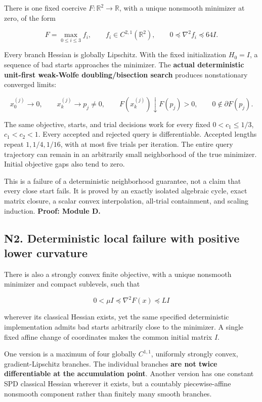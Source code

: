 There is one fixed coercive \(F:\mathbb R^2\to\mathbb R\), with a unique nonsmooth minimizer at zero, of the form

\[
 F=\max_{0\le i\le3}f_i,\qquad f_i\in C^{2,1}(\mathbb R^2),\qquad
 0\preceq\nabla^2f_i\preceq64I.
\]

Every branch Hessian is globally Lipschitz. With the fixed initialization \(H_0=I\), a sequence of bad starts approaches the minimizer. The \textbf{actual deterministic unit-first weak-Wolfe doubling/bisection search} produces nonstationary converged limits:

\[
 x_0^{(j)}\to0,\qquad x_k^{(j)}\to p_j\ne0,\qquad
 F(x_k^{(j)})\downarrow F(p_j)>0,\qquad0\notin\partial F(p_j).
\]

The same objective, starts, and trial decisions work for every fixed \(0<c_1\le1/3\), \(c_1<c_2<1\). Every accepted and rejected query is differentiable. Accepted lengths repeat \(1,1/4,1/16\), with at most five trials per iteration. The entire query trajectory can remain in an arbitrarily small neighborhood of the true minimizer. Initial objective gaps also tend to zero.

This is a failure of a deterministic neighborhood guarantee, not a claim that every close start fails. It is proved by an exactly isolated algebraic cycle, exact matrix closure, a scalar convex interpolation, all-trial containment, and scaling induction. \textbf{Proof: Module D.}

\subsection{N2. Deterministic local failure with positive lower curvature}\label{n2.-deterministic-local-failure-with-positive-lower-curvature}

There is also a strongly convex finite objective, with a unique nonsmooth minimizer and compact sublevels, such that

\[
 0<\mu I\preceq\nabla^2F(x)\preceq LI
\]

wherever its classical Hessian exists, yet the same specified deterministic implementation admits bad starts arbitrarily close to the minimizer. A single fixed affine change of coordinates makes the common initial matrix \(I\).

One version is a maximum of four globally \(C^{1,1}\), uniformly strongly convex, gradient-Lipschitz branches. The individual branches \textbf{are not twice differentiable at the accumulation point}. Another version has one constant SPD classical Hessian wherever it exists, but a countably piecewise-affine nonsmooth component rather than finitely many smooth branches.

